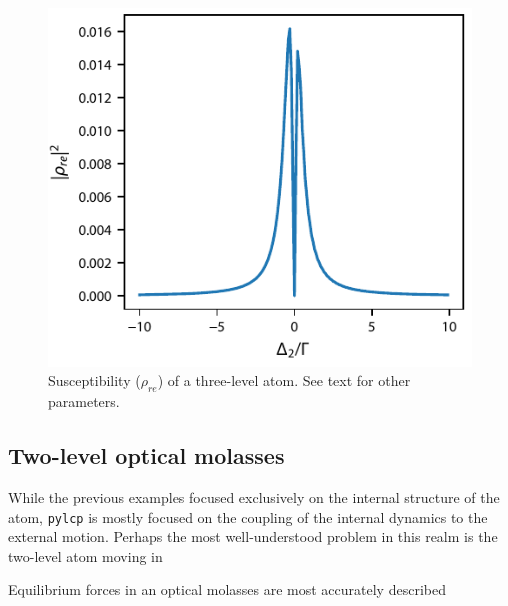 \documentclass[final,5p,times,twocolumn]{elsarticle}
\begin{document}
\begin{figure}
	\center
	\includegraphics{figs/eit_susceptibility.pdf}
	\caption{\label{fig:eit_susceptibility} Susceptibility ($\rho_{re}$) of a three-level atom.  See text for other parameters.}
\end{figure}


\subsection{Two-level optical molasses}
While the previous examples focused exclusively on the internal structure of the atom, {\tt pylcp} is mostly focused on the coupling of the internal dynamics to the external motion.  Perhaps the most well-understood problem in this realm is the two-level atom moving in  

Equilibrium forces in an optical molasses are most accurately described 
\end{document}
